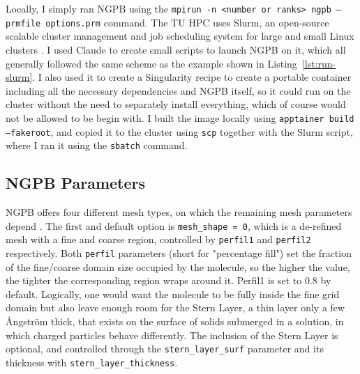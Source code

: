 Locally, I simply ran NGPB using the \texttt{mpirun -n <number or ranks> ngpb --prmfile options.prm} command.
The TU HPC uses Slurm, an open-source scalable cluster management and job scheduling system for large and small Linux clusters \cite{slurm_overview}. 
I used Claude to create small scripts to launch NGPB on it, which all generally followed the same scheme as the example shown in Listing~\ref{lst:run-slurm}. 
I also used it to create a Singularity recipe \cite{kurtzer2017singularity} to create a portable container including all the necessary dependencies and NGPB itself, so it could run on the cluster without the need to separately install everything, which of course would not be allowed to be begin with. 
I built the image locally using \texttt{apptainer build --fakeroot}, and copied it to the cluster using \texttt{scp} together with the Slurm script, where I ran it using the \texttt{sbatch} command.



\subsection{NGPB Parameters}
\label{sec:evaluation-experimental-setup-ngpb-parameters}

NGPB offers four different mesh types, on which the remaining mesh parameters depend \cite{nextgenpb_docs}. 
The first and default option is \texttt{mesh\_shape = 0}, which is a de-refined mesh with a fine and coarse region, controlled by \texttt{perfil1} and \texttt{perfil2} respectively. 
Both \texttt{perfil} parameters (short for "percentage fill") set the fraction of the fine/coarse domain size occupied by the molecule, so the higher the value, the tighter the corresponding region wraps around it. Perfil1 is set to 0.8 by default.
Logically, one would want the molecule to be fully inside the fine grid domain but also leave enough room for the Stern Layer, a thin layer only a few Ångström thick, that exists on the surface of solids submerged in a solution, in which charged particles behave differently.
The inclusion of the Stern Layer is optional, and controlled through the \texttt{stern\_layer\_surf} parameter and its thickness with \texttt{stern\_layer\_thickness}.

